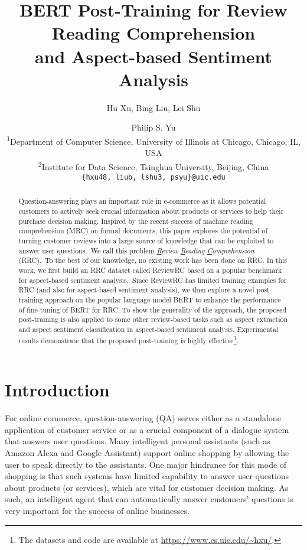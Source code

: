 \documentclass[11pt,a4paper]{article}
\title{BERT Post-Training for Review Reading Comprehension\\and Aspect-based Sentiment Analysis}
\author{Hu Xu\textsuperscript{\text{1}}, Bing Liu\textsuperscript{\text{1}}, Lei Shu\textsuperscript{\text{1}}\and Philip S. Yu\textsuperscript{\text{1,2}}\\
    \textsuperscript{1}{Department of Computer Science, University of Illinois at Chicago, Chicago, IL, USA}\\
    \textsuperscript{2}{Institute for Data Science, Tsinghua University, Beijing, China}\\
    {\tt \{hxu48, liub, lshu3, psyu\}@uic.edu}
}
\date{}
\begin{document}
\maketitle
\begin{abstract}
Question-answering plays an important role in e-commerce as it allows potential customers to actively seek crucial information about products or services to help their purchase decision making. 
Inspired by the recent success of machine reading comprehension (MRC) on formal documents, this paper explores the potential of turning customer reviews into a large source of knowledge that can be exploited to answer user questions.~We call this problem \textit{\underline{R}eview \underline{R}eading \underline{C}omprehension} (RRC).~To the best of our knowledge, no existing work has been done on RRC. In this work, we first build an RRC dataset called ReviewRC based on a popular benchmark for aspect-based sentiment analysis.~Since ReviewRC has limited training examples for RRC (and also for aspect-based sentiment analysis), we then explore a novel post-training approach on the popular language model BERT to enhance the performance of fine-tuning of BERT for RRC.
To show the generality of the approach, the proposed post-training is also applied to some other review-based tasks such as aspect extraction and aspect sentiment classification in aspect-based sentiment analysis. 
Experimental results demonstrate that the proposed post-training is highly effective\footnote{The datasets and code are available at \url{https://www.cs.uic.edu/~hxu/}. 
}.
\end{abstract}

\section{Introduction}

For online commerce, question-answering (QA) serves either as a standalone application of customer service or as a crucial component of a dialogue system that answers user questions.
Many intelligent personal assistants (such as Amazon Alexa and Google Assistant) support online shopping by allowing the user to speak directly to the assistants. 
One major hindrance for this mode of shopping is that such systems have limited capability to answer user questions about products (or services), which are vital for customer decision making.
As such, an intelligent agent that can automatically answer customers' questions is very important for the success of online businesses.
\end{document}
